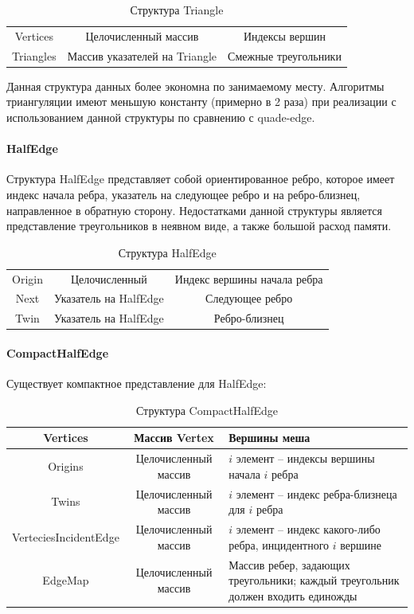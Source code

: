 \documentclass{fefu}
\begin{document}
\begin{table}[H]
    \centering
    \begin{tabular}{|c|c|c|}
        \hline
        Vertices & Целочисленный массив & Индексы вершин\\
        Triangles & Массив указателей на Triangle & Смежные треугольники\\
        \hline
    \end{tabular}
    \caption{Структура Triangle}
\end{table}

Данная структура данных более экономна по занимаемому месту. Алгоритмы триангуляции имеют меньшую константу (примерно в
2 раза) при реализации с использованием данной структуры по сравнению с quade-edge.
\paragraph{HalfEdge}
Структура HalfEdge представляет собой ориентированное ребро, которое имеет индекс начала ребра, указатель на следующее
ребро и на ребро-близнец, направленное в обратную сторону. Недостатками данной структуры является представление
треугольников в неявном виде, а также большой расход памяти.

\begin{table}[H]
    \centering
    \begin{tabular}{|c|c|c|}
        \hline
        Origin & Целочисленный & Индекс вершины начала ребра\\
        Next & Указатель на HalfEdge & Следующее ребро \\
        Twin & Указатель на HalfEdge & Ребро-близнец \\
        \hline
    \end{tabular}
    \caption{Структура HalfEdge}
\end{table}
\paragraph{CompactHalfEdge}

Существует компактное представление для HalfEdge\cite{CHE}:

\begin{table}[H]
    \centering
    \begin{tabular}{|c|c|p{6cm}|}
        \hline
        Vertices & Массив Vertex & Вершины меша\\
        \hline
        Origins & Целочисленный массив & $i$ элемент -- индексы вершины начала $i$ ребра\\
        \hline
        Twins & Целочисленный массив & $i$ элемент -- индекс ребра-близнеца для $i$ ребра\\
        \hline
        VerteciesIncidentEdge & Целочисленный массив & $i$ элемент -- индекс какого-либо ребра, инцидентного $i$ вершине\\
        \hline
        EdgeMap & Целочисленный массив & Массив ребер, задающих треугольники; каждый треугольник должен входить единожды\\
        \hline
    \end{tabular}
    \caption{Структура CompactHalfEdge}
\end{table}
\end{document}
